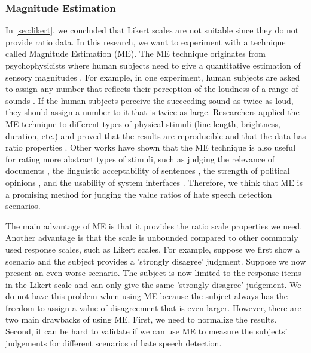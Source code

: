 \subsubsection{Magnitude Estimation}
\label{sec:me}
In \ref{sec:likert}, we concluded that Likert scales are not suitable since they do not provide ratio data. In this research, we want to experiment with a technique called Magnitude Estimation (ME). The ME technique originates from psychophysicists where human subjects need to give a quantitative estimation of sensory magnitudes \cite{stevens1956direct}. For example, in one experiment, human subjects are asked to assign any number that reflects their perception of the loudness of a range of sounds \cite{stevens1956direct}. If the human subjects perceive the succeeding sound as twice as loud, they should assign a number to it that is twice as large. Researchers applied the ME technique to different types of physical stimuli (line length, brightness, duration, etc.) and proved that the results are reproducible and that the data has ratio properties \cite{moskowitz1977magnitude}. Other works have shown that the ME technique is also useful for rating more abstract types of stimuli, such as judging the relevance of documents \cite{maddalena2017crowdsourcing}, the linguistic acceptability of sentences \cite{bard1996magnitude}, the strength of political opinions \cite{lodge1979comparisons, lodge1976calibration}, and the usability of system interfaces \cite{mcgee2004master}. Therefore, we think that ME is a promising method for judging the value ratios of hate speech detection scenarios.

The main advantage of ME is that it provides the ratio scale properties we need. Another advantage is that the scale is unbounded compared to other commonly used response scales, such as Likert scales. For example, suppose we first show a scenario and the subject provides a 'strongly disagree' judgment. Suppose we now present an even worse scenario. The subject is now limited to the response items in the Likert scale and can only give the same 'strongly disagree' judgement. We do not have this problem when using ME because the subject always has the freedom to assign a value of disagreement that is even larger. However, there are two main drawbacks of using ME. First, we need to normalize the results. Second, it can be hard to validate if we can use ME to measure the subjects' judgements for different scenarios of hate speech detection.

